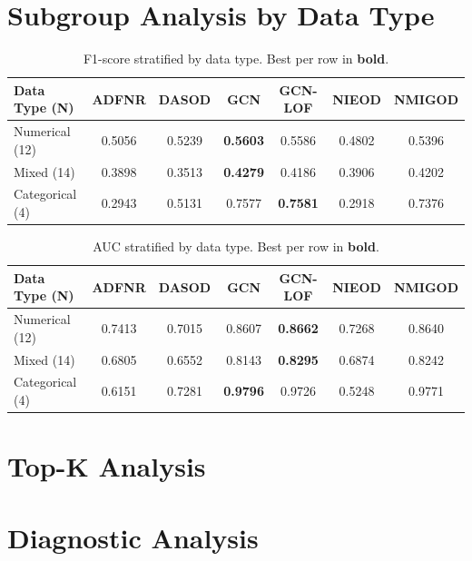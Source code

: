 \documentclass[11pt,a4paper]{article}
\begin{document}
\section{Subgroup Analysis by Data Type}
\begin{table}[H]\centering\caption{F1-score stratified by data type. Best per row in \textbf{bold}.}\label{tab:subgroup}\small
\begin{tabular}{lcccccc}
\toprule
Data Type (N) & ADFNR & DASOD & GCN & GCN-LOF & NIEOD & NMIGOD \\
\midrule
Numerical (12) & 0.5056 & 0.5239 & \textbf{0.5603} & 0.5586 & 0.4802 & 0.5396 \\
Mixed (14) & 0.3898 & 0.3513 & \textbf{0.4279} & 0.4186 & 0.3906 & 0.4202 \\
Categorical (4) & 0.2943 & 0.5131 & 0.7577 & \textbf{0.7581} & 0.2918 & 0.7376 \\
\bottomrule\end{tabular}\end{table}
\begin{table}[H]\centering\caption{AUC stratified by data type. Best per row in \textbf{bold}.}\small
\begin{tabular}{lcccccc}
\toprule
Data Type (N) & ADFNR & DASOD & GCN & GCN-LOF & NIEOD & NMIGOD \\
\midrule
Numerical (12) & 0.7413 & 0.7015 & 0.8607 & \textbf{0.8662} & 0.7268 & 0.8640 \\
Mixed (14) & 0.6805 & 0.6552 & 0.8143 & \textbf{0.8295} & 0.6874 & 0.8242 \\
Categorical (4) & 0.6151 & 0.7281 & \textbf{0.9796} & 0.9726 & 0.5248 & 0.9771 \\
\bottomrule\end{tabular}\end{table}

\section{Top-K Analysis}
\section{Diagnostic Analysis}
\end{document}
